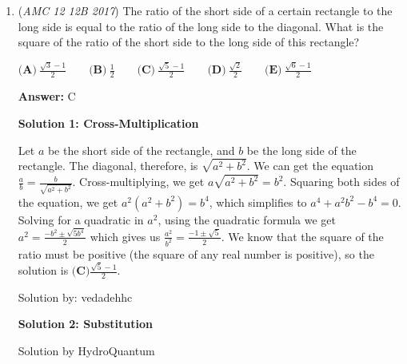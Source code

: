\begin{enumerate}
 First compute the values of $\sin(x)$ to be $(0, 1, 0, -1)$ over the set $S$. Therefore, the values of $\cos(\sin(x))$ are $(1, \cos(1), 1, \cos(-1))$. You may notice that one appears twice: at the values $x=0$ and $x=\pi$, and guess that the period is $\pi$. Alternatively, you can use the fact that $\cos(-x)=\cos(x)$ as in solution 1, which can be shown by considering the unit circle definition of cosine. You then get that the values of $\cos(\sin(x))$ are $(1, \cos(1), 1, \cos(1))$, which is more obviously periodic with period $\pi$, therefore the answer is $\boxed{(B)}$.

 NOTE: This method is not strict proof that the function has period $\pi$ as we only consider 4 values in the interval.

 


	\item (\textit{AMC 12 12B 2017}) The ratio of the short side of a certain rectangle to the long side is equal to the ratio of the long side to the diagonal. What is the square of the ratio of the short side to the long side of this rectangle?


 $\textbf{(A)}\ \frac{\sqrt{3}-1}{2}\qquad\textbf{(B)}\ \frac{1}{2}\qquad\textbf{(C)}\ \frac{\sqrt{5}-1}{2} \qquad\textbf{(D)}\ \frac{\sqrt{2}}{2} \qquad\textbf{(E)}\ \frac{\sqrt{6}-1}{2}$

 \textbf{Answer: }C



\textbf{Solution 1: Cross-Multiplication}

Let $a$ be the short side of the rectangle, and $b$ be the long side of the rectangle. The diagonal, therefore, is $\sqrt{a^2 + b^2}$. We can get the equation $\frac{a}{b} = \frac{b}{\sqrt{a^2 + b^2}}$. Cross-multiplying, we get $a\sqrt{a^2 + b^2} = b^2$. Squaring both sides of the equation, we get $a^2 (a^2 + b^2) = b^4$, which simplifies to $a^4 + a^2b^2 - b^4 = 0$. Solving for a quadratic in $a^2$, using the quadratic formula we get $a^2 = \frac{-b^2 \pm \sqrt{5b^4}}{2}$ which gives us $\frac{a^2}{b^2} = \frac{-1 \pm \sqrt{5}}{2}$. We know that the square of the ratio must be positive (the square of any real number is positive), so the solution is $\boxed{\textbf{(C)} \frac{\sqrt{5}-1}{2}}$.

 Solution by: vedadehhc

 



\textbf{Solution 2: Substitution}

Solution by HydroQuantum


\end{enumerate}
